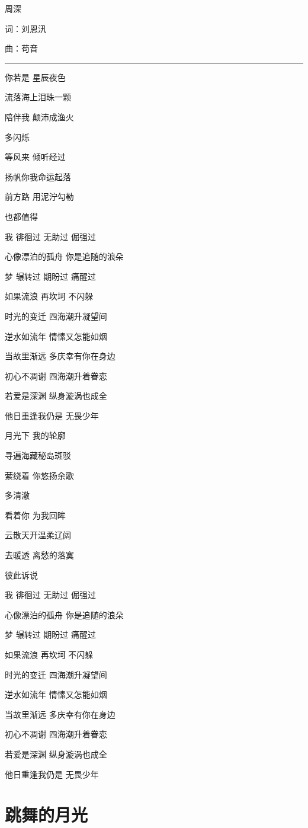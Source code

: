 \documentclass[]{ctexbook}
\begin{document}
周深

词：刘恩汛

曲：苟音

\begin{center}\rule{0.5\linewidth}{0.5pt}\end{center}

你若是 星辰夜色

流落海上泪珠一颗

陪伴我 颠沛成渔火

多闪烁

等风来 倾听经过

扬帆你我命运起落

前方路 用泥泞勾勒

也都值得

我 徘徊过 无助过 倔强过

心像漂泊的孤舟 你是追随的浪朵

梦 辗转过 期盼过 痛醒过

如果流浪 再坎坷 不闪躲

时光的变迁 四海潮升凝望间

逆水如流年 情愫又怎能如烟

当故里渐远 多庆幸有你在身边

初心不凋谢 四海潮升着眷恋

若爱是深渊 纵身漩涡也成全

他日重逢我仍是 无畏少年

月光下 我的轮廓

寻遍海藏秘岛斑驳

萦绕着 你悠扬余歌

多清澈

看着你 为我回眸

云散天开温柔辽阔

去暖透 离愁的落寞

彼此诉说

我 徘徊过 无助过 倔强过

心像漂泊的孤舟 你是追随的浪朵

梦 辗转过 期盼过 痛醒过

如果流浪 再坎坷 不闪躲

时光的变迁 四海潮升凝望间

逆水如流年 情愫又怎能如烟

当故里渐远 多庆幸有你在身边

初心不凋谢 四海潮升着眷恋

若爱是深渊 纵身漩涡也成全

他日重逢我仍是 无畏少年

\section*{跳舞的月光}\label{dancing-moonshine}
\end{document}
